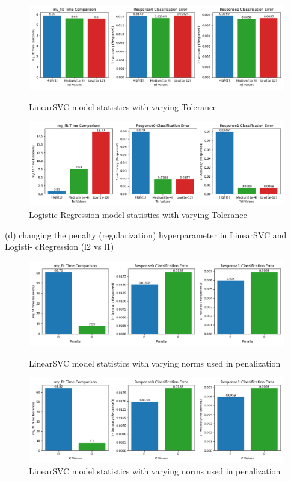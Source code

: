 \documentclass{article}
\begin{document}
\begin{figure}[H]
  \centering
  \includegraphics[scale=0.4]{tol_SVC.png}
  \caption{LinearSVC model statistics with varying Tolerance}
  \includegraphics[scale=0.4]{tol_Log.png}
  \caption{Logistic Regression model statistics with varying Tolerance}
\end{figure}

(d) changing the penalty (regularization) hyperparameter in LinearSVC and Logisti-
cRegression (l2 vs l1)

\begin{figure}[H]
  \centering
  \includegraphics[scale=0.4]{penalty_svc.png}
  \caption{LinearSVC model statistics with varying norms used in penalization}
  \includegraphics[scale=0.4]{penalty_log.png}
  \caption{LinearSVC model statistics with varying norms used in penalization}
\end{figure}
\end{document}
